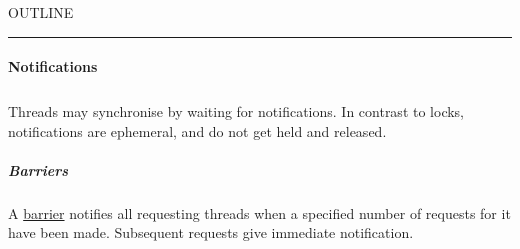 


    OUTLINE
  \tableofcontents
\begin{center}
\rule{3in}{0.4pt}
\end{center}

\paragraph{Notifications}\hypertarget{notifications}{}\label{notifications}

\begin{align*}
  [ \
  \textsf{Barriers
          } \ & \textsf{} \\
  \KEY{Funcon} \quad & \NAMEREF{barrier-create} \\
  \KEY{Funcon} \quad & \NAMEREF{barrier-sync} \\
  \KEY{Funcon} \quad & \NAMEREF{barrier-sync-else-wait} \\
  \textsf{Conditions
          } \ & \textsf{} \\
  \KEY{Funcon} \quad & \NAMEREF{condition-create} \\
  \KEY{Funcon} \quad & \NAMEREF{condition-wait} \\
  \KEY{Funcon} \quad & \NAMEREF{condition-wait-with-lock} \\
  \KEY{Funcon} \quad & \NAMEREF{condition-notify-all} \\
  \KEY{Funcon} \quad & \NAMEREF{condition-notify-first} \\
  \textsf{Rendezvous
          } \ & \textsf{} \\
  \KEY{Funcon} \quad & \NAMEREF{rendezvous-create} \\
  \KEY{Funcon} \quad & \NAMEREF{rendezvous-sync} \\
  \KEY{Funcon} \quad & \NAMEREF{rendezvous-sync-else-wait}
  \ ]
\end{align*}
Threads may synchronise by waiting for notifications. In contrast to locks,
notifications are ephemeral, and do not get held and released.

\subparagraph{Barriers}\hypertarget{barriers}{}\label{barriers}

A \href{https://en.wikipedia.org/wiki/Barrier_(computer_science)}{barrier} notifies all requesting threads when a specified number of requests
for it have been made. Subsequent requests give immediate notification.

